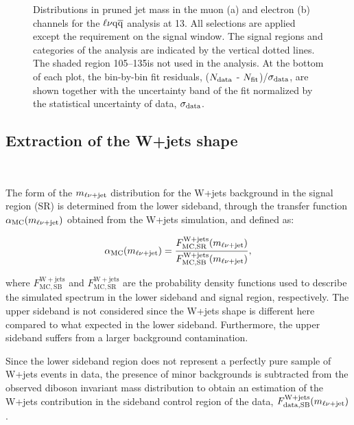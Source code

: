 \begin{figure}[!htb]
\centering     %
{}
\caption{Distributions in pruned jet mass in the muon (a) and electron (b) channels for the $\ell\nu\mathrm{q}\overline{\mathrm{q}}$ analysis at 13\TeV. All selections are applied except the requirement on the \mJ signal window. The signal regions and \mJ categories of the analysis are indicated by the vertical dotted lines. The shaded \mJ region 105--135\GeV is not used in the analysis. At the bottom of each plot, the bin-by-bin fit residuals, ($N_{\rm data}$ - $N_{\rm fit}$)/$\sigma_{\rm data}$, are shown together with the uncertainty band of the fit normalized by the statistical uncertainty of data, $\sigma_{\rm data}$.}
\label{fig:mjfit13TeV}
\end{figure}

\subsection{Extraction of the W+jets shape}~\label{subsec:wjetshape}

The form of the $m_{\ell\nu+{\rm jet}}$ distribution for the W+jets background in the signal region (SR) is determined from the lower \mJ sideband, through the transfer function $\alpha_\mathrm{MC}(m_{\ell\nu+{\rm jet}})$ obtained from the W+jets simulation, and defined as:

\begin{equation}
\alpha_\mathrm{MC}(m_{\ell\nu+{\rm jet}}) = \frac{F_\mathrm{MC, SR}^{\mathrm{W+jets}}(m_{\ell\nu+{\rm jet}})}{F_\mathrm{MC, SB}^{\mathrm{W+jets}}(m_{\ell\nu+{\rm jet}})},
\end{equation}

where $F_\mathrm{MC, SB}^{\mathrm{W+jets}}$ and $F_\mathrm{MC, SR}^{\mathrm{W+jets}}$ are the probability density functions used to describe the simulated \mlvj spectrum in the lower \mJ sideband and signal region, respectively.
The upper \mJ sideband is not considered since the W+jets shape is different here compared to what expected in the lower sideband. Furthermore, the upper sideband suffers from a larger \ttbar background contamination.

Since the lower sideband region does not represent a perfectly pure sample of W+jets events in data, the presence of minor backgrounds is subtracted from the observed diboson invariant mass distribution
to obtain an estimation of the W+jets contribution in the sideband control region of the data, $F_\mathrm{data, SB}^{\mathrm{W+jets}}(m_{\ell\nu+{\rm jet}})$.

